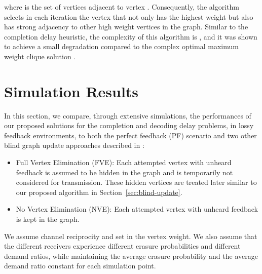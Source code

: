 \documentclass[10pt,jounral]{IEEEtran}
\newcommand{\sref}[1]{Section~\ref{#1}}
\newcommand{\ignore}[1]{}
\begin{document}
where  is the set of vertices adjacent to vertex . Consequently, the algorithm selects in each iteration the vertex that not only has the highest weight  but also has strong adjacency to other high weight vertices in the graph. Similar to the completion delay heuristic, the complexity of this algorithm is , and it was shown to achieve a small degradation compared to the complex optimal maximum weight clique solution \cite{GC10}.



\section{Simulation Results} \label{sec:simulations}
In this section, we compare, through extensive simulations, the performances of our proposed solutions for the completion and decoding delay problems, in lossy feedback environments, to both the perfect feedback (PF) scenario and two other blind graph update approaches described in \cite{ICC11}:
\begin{itemize}
\item Full Vertex Elimination (FVE): Each attempted vertex with unheard feedback is assumed to be hidden in the graph and is temporarily not considered for transmission. These hidden vertices are treated later similar to our proposed algorithm in \sref{sec:blind-update}.
\item No Vertex Elimination (NVE): Each attempted vertex with unheard feedback is kept in the graph.\ignore{ NVE rapidly re-attempts these uncertain vertices, thus giving the chance to the sender to receive feedback from their receivers and to determine their accurate reception status. This fast re-attempts of vertices and SFM update may be of greater importance in this lossy feedback context, especially at the end of the recovery phase, as it can help the sender make better coding decisions towards completion.}
\end{itemize}
We assume channel reciprocity and set  in the vertex weight. We also assume that the different receivers experience different erasure probabilities and different demand ratios, while maintaining the average erasure probability  and the average demand ratio  constant for each simulation point.
\end{document}
